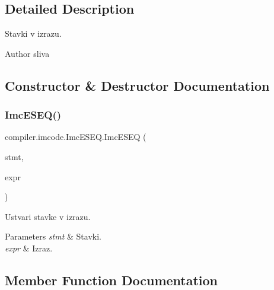 \subsection{Detailed Description}
Stavki v izrazu.

\begin{DoxyAuthor}{Author}
sliva 
\end{DoxyAuthor}


\subsection{Constructor \& Destructor Documentation}
\mbox{\label{classcompiler_1_1imcode_1_1_imc_e_s_e_q_ab097c7cd279ab955115518e8d19181a6}} 
\subsubsection{\texorpdfstring{Imc\+E\+S\+E\+Q()}{ImcESEQ()}}
{\footnotesize\ttfamily compiler.\+imcode.\+Imc\+E\+S\+E\+Q.\+Imc\+E\+S\+EQ (\begin{DoxyParamCaption}\item[{\hyperlink{classcompiler_1_1imcode_1_1_imc_stmt}{Imc\+Stmt}}]{stmt,  }\item[{\hyperlink{classcompiler_1_1imcode_1_1_imc_expr}{Imc\+Expr}}]{expr }\end{DoxyParamCaption})}

Ustvari stavke v izrazu.


\begin{DoxyParams}{Parameters}
{\em stmt} & Stavki. \\
\hline
{\em expr} & Izraz. \\
\hline
\end{DoxyParams}


\subsection{Member Function Documentation}
\mbox{\label{classcompiler_1_1imcode_1_1_imc_e_s_e_q_ae7ffd559e60c89d8e1d39cd0bab8df66}} 
